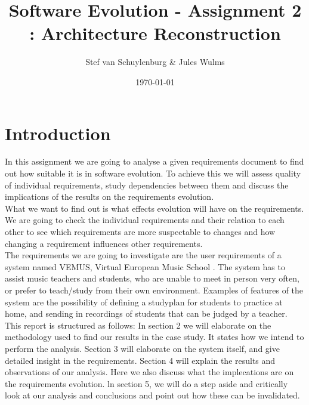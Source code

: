 \documentclass[a4paper,11pt]{article}
\title{Software Evolution - Assignment 2 : Architecture Reconstruction}
\author{Stef van Schuylenburg & Jules Wulms}
\date{\today}
\begin{document}
	\maketitle

	\section{Introduction}
		In this assignment we are going to analyse a given requirements document to find out how suitable it is in software evolution. To achieve this we will assess quality of individual requirements, study dependencies between them and discuss the implications of the results on the requirements evolution. \\
		What we want to find out is what effects evolution will have on the requirements. We are going to check the individual requirements and their relation to each other to see which requirements are more suspectable to changes and how changing a requirement influences other requirements.\\
		The requirements we are going to investigate are the user requirements of a system named VEMUS, Virtual European Music School \cite{VEMUS}. The system has to assist music teachers and students, who are unable to meet in person very often, or prefer to teach/study from their own environment. Examples of features of the system are the possibility of defining a studyplan for students to practice at home, and sending in recordings of students that can be judged by a teacher. \\
		This report is structured as follows: In section 2 we will elaborate on the methodology used to find our results in the case study. It states how we intend to perform the analysis. Section 3 will elaborate on the system itself, and give detailed insight in the requirements. Section 4 will explain the results and observations of our analysis. Here we also discuss what the implecations are on the requirements evolution. ln section 5, we will do a step aside and critically look at our analysis and conclusions and point out how these can be invalidated. 
	
\end{document}
